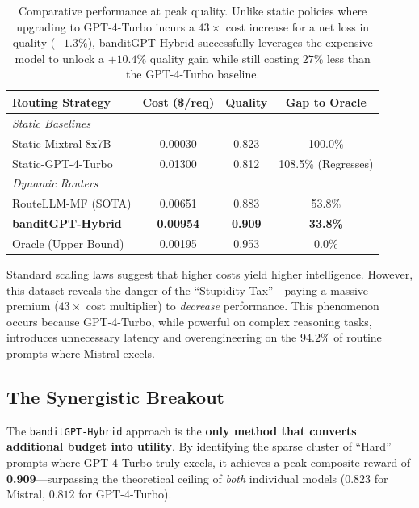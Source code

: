\begin{table}[t]
\centering
\caption{Comparative performance at peak quality. Unlike static policies where upgrading to GPT-4-Turbo incurs a $43\times$ cost increase for a net loss in quality ($-1.3\%$), banditGPT-Hybrid successfully leverages the expensive model to unlock a $+10.4\%$ quality gain while still costing $27\%$ less than the GPT-4-Turbo baseline.}
\label{tab:comparative_performance}
\small
\begin{tabular}{lccc}
\toprule
\textbf{Routing Strategy} & \textbf{Cost (\$/req)} & \textbf{Quality} & \textbf{Gap to Oracle} \\
\midrule
\multicolumn{4}{l}{\textit{Static Baselines}} \\
\quad Static-Mixtral 8x7B & 0.00030 & 0.823 & 100.0\% \\
\quad Static-GPT-4-Turbo & 0.01300 & 0.812 & 108.5\% (Regresses) \\
\midrule
\multicolumn{4}{l}{\textit{Dynamic Routers}} \\
\quad RouteLLM-MF (SOTA) & 0.00651 & 0.883 & 53.8\% \\
\quad \textbf{banditGPT-Hybrid} & \textbf{0.00954} & \textbf{0.909} & \textbf{33.8\%} \\
\midrule
\quad Oracle (Upper Bound) & 0.00195 & 0.953 & 0.0\% \\
\bottomrule
\end{tabular}
\end{table}

Standard scaling laws suggest that higher costs yield higher intelligence. However, this dataset reveals the danger of the ``Stupidity Tax''---paying a massive premium ($43\times$ cost multiplier) to \textit{decrease} performance. This phenomenon occurs because GPT-4-Turbo, while powerful on complex reasoning tasks, introduces unnecessary latency and overengineering on the $94.2\%$ of routine prompts where Mistral excels.

\subsection{The Synergistic Breakout}

The \texttt{banditGPT-Hybrid} approach is the \textbf{only method that converts additional budget into utility}. By identifying the sparse cluster of ``Hard'' prompts where GPT-4-Turbo truly excels, it achieves a peak composite reward of \textbf{0.909}---surpassing the theoretical ceiling of \textit{both} individual models ($0.823$ for Mistral, $0.812$ for GPT-4-Turbo).

